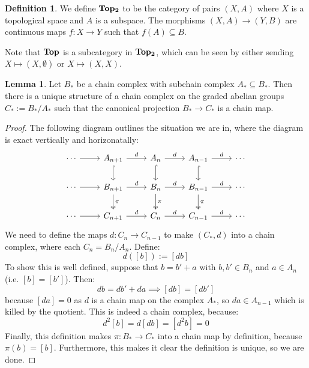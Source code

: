 \documentclass[11pt, oneside]{amsart}   	%
\theoremstyle{definition}
\newtheorem{definition}{Definition}[section]
\newtheorem{lemma}[theorem]{Lemma}
\begin{document}
\begin{definition}
	We define $\bf{Top_2}$ to be the category of pairs $(X, A)$ where $X$ is a topological space and $A$ is a subspace. 
	The morphisms $(X, A)\rightarrow (Y, B)$ are continuous maps $f : X\rightarrow Y$ such that $f(A)\subseteq B$. 
\end{definition}

Note that $\bf{Top}$ is a subcategory in $\bf{Top_2}$, which can be seen by either sending $X\mapsto (X, \emptyset)$ or 
$X\mapsto (X, X)$. 


\begin{lemma}
	Let $B_*$ be a chain complex with subchain complex $A_*\subseteq B_*$. Then there is a unique structure of a chain 
	complex on the graded abelian groups $C_* := B_* / A_*$ such that the canonical projection $B_*\rightarrow C_*$ 
	is a chain map. 
\end{lemma}

\begin{proof}
	The following diagram outlines the situation we are in, where the diagram is exact vertically and horizonatally:
	\begin{equation}\begin{tikzcd}
		\cdots \arrow[r] & A_{n + 1} \arrow[r, "d"] \arrow[d, hook] & A_n\arrow[r, "d"] \arrow[d, hook] & A_{n - 1}\arrow[r, "d"] 
		\arrow[d, hook] & \cdots \\
		\cdots \arrow[r] & B_{n + 1} \arrow[r, "d"] \arrow[d, "\pi", twoheadrightarrow] & B_n\arrow[r, "d"]\arrow[d, "\pi", 
		twoheadrightarrow] & B_{n - 1} \arrow[r, "d"] \arrow[d, "\pi", twoheadrightarrow] & \cdots \\
		\cdots \arrow[r] & C_{n + 1}\arrow[r, "d"] & C_n\arrow[r, "d"] & C_{n - 1}\arrow[r, "d"] & \cdots
	\end{tikzcd} \end{equation}
	We need to define the maps $d : C_n\rightarrow C_{n - 1}$ to make $(C_*, d)$ into a chain complex, where each 
	$C_n = B_n / A_n$. Define:
	\begin{equation}
		d([b]) := [db]
	\end{equation}
	To show this is well defined, suppose that $b = b' + a$ with $b, b'\in B_n$ and $a\in A_n$ (i.e. $[b] = [b']$). Then:
	\begin{equation}
		db = db' + da\implies [db] = [db']
	\end{equation}
	because $[da] = 0$ as $d$ is a chain map on the complex $A_*$, so $da\in A_{n - 1}$ which is killed by the quotient. 
	This is indeed a chain complex, because:
	\begin{equation}
		d^2[b] = d[db] = [d^2 b] = 0
	\end{equation}
	Finally, this definition makes $\pi : B_*\rightarrow C_*$ into a chain map by definition, because $\pi(b) = [b]$. Furthermore, 
	this makes it clear the definition is unique, so we are done.
\end{proof}
\end{document}
